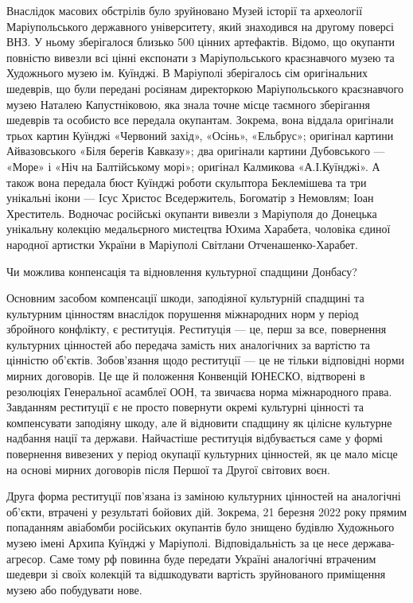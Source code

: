 Внаслідок масових обстрілів було зруйновано Музей історії та археології
Маріупольського державного університету, який знаходився на другому поверсі
ВНЗ. У ньому зберігалося близько 500 цінних артефактів. Відомо, що окупанти
повністю вивезли всі цінні експонати з Маріупольського краєзнавчого музею та
Художнього музею ім. Куїнджі. В Маріуполі зберігалось сім оригінальних
шедеврів, що були передані росіянам директоркою Маріупольського краєзнавчого
музею Наталею Капустніковою, яка знала точне місце таємного зберігання шедеврів
та особисто все передала окупантам. Зокрема, вона віддала оригінали трьох
картин Куїнджі «Червоний захід», «Осінь», «Ельбрус»; оригінал картини
Айвазовського «Біля берегів Кавказу»; два оригінали картини Дубовського —
«Море» і «Ніч на Балтійському морі»; оригінал Калмикова «А.І.Куїнджі». А також
вона передала бюст Куїнджі роботи скульптора Беклемішева та три унікальні ікони
— Ісус Христос Вседержитель, Богоматір з Немовлям; Іоан Хреститель. Водночас
російські окупанти вивезли з Маріуполя до Донецька унікальну колекцію
медальєрного мистецтва Юхима Харабета, чоловіка єдиної народної артистки
України в Маріуполі Світлани Отченашенко-Харабет.

Чи можлива конпенсація та відновлення культурної спадщини Донбасу?

Основним засобом компенсації шкоди, заподіяної культурній спадщині та
культурним цінностям внаслідок порушення міжнародних норм у період збройного
конфлікту, є реституція. Реституція — це, перш за все, повернення культурних
цінностей або передача замість них аналогічних за вартістю та цінністю
об'єктів. Зобов'язання щодо реституції — це не тільки відповідні норми мирних
договорів. Це ще й положення Конвенцій ЮНЕСКО, відтворені в резолюціях
Генеральної асамблеї ООН, та звичаєва норма міжнародного права. Завданням
реституції є не просто повернути окремі культурні цінності та компенсувати
заподіяну шкоду, але й відновити спадщину як цілісне культурне надбання нації
та держави. Найчастіше реституція відбувається саме у формі повернення
вивезених у період окупації культурних цінностей, як це мало місце на основі
мирних договорів після Першої та Другої світових воєн.

Друга форма реституції пов'язана із заміною культурних цінностей на аналогічні
об'єкти, втрачені у результаті бойових дій. Зокрема, 21 березня 2022 року
прямим попаданням авіабомби російських окупантів було знищено будівлю
Художнього музею імені Архипа Куїнджі у Маріуполі. Відповідальність за це несе
держава-агресор. Саме тому рф повинна буде передати Україні аналогічні
втраченим шедеври зі своїх колекцій та відшкодувати вартість зруйнованого
приміщення музею або побудувати нове.

